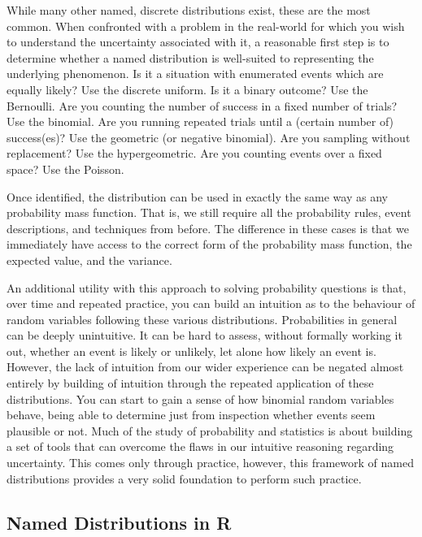 \documentclass[
  letterpaper,
  DIV=11,
  numbers=noendperiod]{scrreprt}
\theoremstyle{definition}
\theoremstyle{definition}
\theoremstyle{definition}
\theoremstyle{remark}
\begin{document}
While many other named, discrete distributions exist, these are the most
common. When confronted with a problem in the real-world for which you
wish to understand the uncertainty associated with it, a reasonable
first step is to determine whether a named distribution is well-suited
to representing the underlying phenomenon. Is it a situation with
enumerated events which are equally likely? Use the discrete uniform. Is
it a binary outcome? Use the Bernoulli. Are you counting the number of
success in a fixed number of trials? Use the binomial. Are you running
repeated trials until a (certain number of) success(es)? Use the
geometric (or negative binomial). Are you sampling without replacement?
Use the hypergeometric. Are you counting events over a fixed space? Use
the Poisson.

Once identified, the distribution can be used in exactly the same way as
any probability mass function. That is, we still require all the
probability rules, event descriptions, and techniques from before. The
difference in these cases is that we immediately have access to the
correct form of the probability mass function, the expected value, and
the variance.

An additional utility with this approach to solving probability
questions is that, over time and repeated practice, you can build an
intuition as to the behaviour of random variables following these
various distributions. Probabilities in general can be deeply
unintuitive. It can be hard to assess, without formally working it out,
whether an event is likely or unlikely, let alone how likely an event
is. However, the lack of intuition from our wider experience can be
negated almost entirely by building of intuition through the repeated
application of these distributions. You can start to gain a sense of how
binomial random variables behave, being able to determine just from
inspection whether events seem plausible or not. Much of the study of
probability and statistics is about building a set of tools that can
overcome the flaws in our intuitive reasoning regarding uncertainty.
This comes only through practice, however, this framework of named
distributions provides a very solid foundation to perform such practice.

\subsection{Named Distributions in R}\label{named-distributions-in-r}
\end{document}
